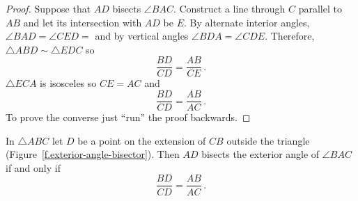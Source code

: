 
\begin{proof}
Suppose that $AD$ bisects $\angle BAC$. Construct a line through $C$ parallel to $AB$ and let its intersection with $AD$ be $E$. By alternate interior angles, $\angle BAD=\angle CED=$ and by vertical angles $\angle BDA=\angle CDE$. Therefore, $\triangle ABD\sim \triangle EDC$ so
\[
\frac{BD}{CD}=\frac{AB}{CE}\,.
\]
$\triangle ECA$ is isosceles so $CE=AC$ and
\[
\frac{BD}{CD}=\frac{AB}{AC}\,.
\]
To prove the converse just ``run'' the proof backwards.\hqed
\end{proof}


\begin{theorem}
\label{thm.exterior-angle-bisector}
In $\triangle ABC$ let $D$ be a point on the extension of $CB$ outside the triangle (Figure~\ref{f.exterior-angle-bisector}). Then $AD$ bisects the exterior angle of $\angle BAC$ if and only if
\[
\frac {BD}{CD}=\frac {AB}{AC}\,.
\]
\end{theorem}


